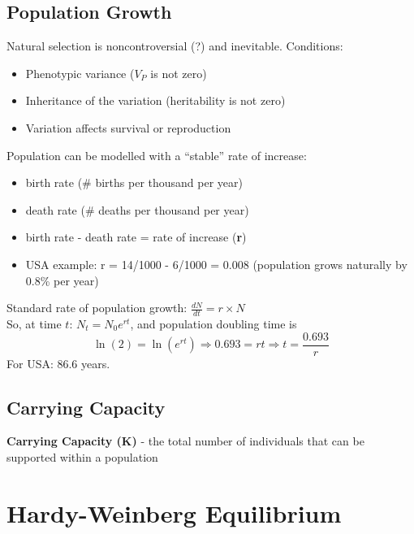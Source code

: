 \documentclass{scrartcl}
\begin{document}
\subsection{Population Growth}
\label{sec:5-5}
Natural selection is noncontroversial (?) and inevitable. 
Conditions:
\begin{itemize}
\item Phenotypic variance ($V_P$ is not zero)
\item Inheritance of the variation (heritability is not zero)
\item Variation affects survival or reproduction
\end{itemize}
Population can be modelled with a ``stable'' rate of increase:
\begin{itemize}
\item birth rate (\# births per thousand per year)
\item death rate (\# deaths per thousand per year)
\item birth rate - death rate = rate of increase ({\bf r})
\item USA example: r = 14/1000 - 6/1000 = 0.008 (population grows naturally by 0.8\% per year)
\end{itemize}
Standard rate of population growth: $\frac{dN}{dt} = r \times N$ \\
So, at time $t$: $N_t = N_0 e^{rt}$, and population doubling time is 
$$\ln(2) = \ln(e^{rt}) \Rightarrow 0.693 = rt \Rightarrow t = \frac{0.693}r$$
For USA: 86.6 years.
\subsection{Carrying Capacity}
\label{sec:5-6}
{\bf Carrying Capacity (K)} - the total number of individuals that can be supported within a population

\section{Hardy-Weinberg Equilibrium}
\label{sec:06-1}
\end{document}
